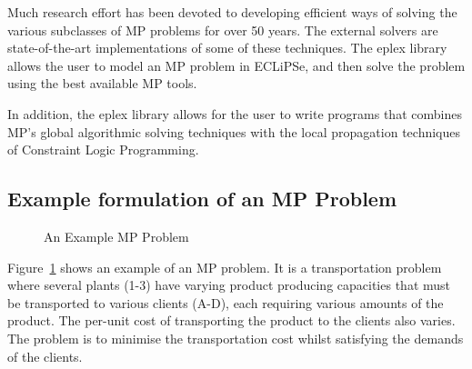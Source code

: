 Much research effort has been devoted to developing efficient ways of
solving the various subclasses of MP problems for over 50 years. The
external solvers are state-of-the-art implementations of some of these
techniques. The eplex library allows the user to model an MP problem in
ECLiPSe, and then solve the problem using the best available MP tools.

In addition, the eplex library allows for the user to write programs that
combines MP's global algorithmic solving techniques with the local
propagation techniques of Constraint Logic
Programming. 

\subsection{Example formulation of an MP Problem} 
\begin{figure}
\begin{center}
\end{center}
\caption{An Example MP Problem}
\label{tpprob}
\end{figure}

Figure~\ref{tpprob} shows an example of an MP problem.
It is a transportation problem where 
several plants (1-3) have varying product producing capacities that must
be transported to various clients (A-D), each requiring various amounts of
the product. The per-unit cost of transporting the product to
the clients also varies. The problem is to minimise the transportation
cost whilst satisfying the demands of the clients. 


